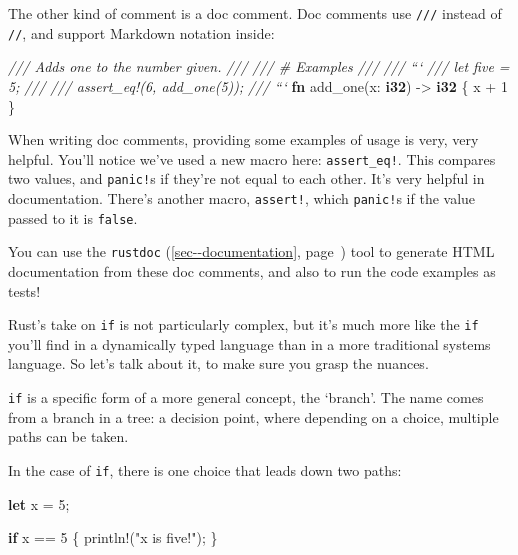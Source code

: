 \documentclass[a4paper,]{book}
\renewcommand*{\hyperref}[2][\ar]{%
  \def\ar{#2}%
  #2 (\autoref{#1}, page~\pageref{#1})}
\newenvironment{Shaded}{\begin{snugshade}}{\end{snugshade}}
\newcommand{\KeywordTok}[1]{\textcolor[rgb]{0.13,0.29,0.53}{\textbf{{#1}}}}
\newcommand{\DecValTok}[1]{\textcolor[rgb]{0.00,0.00,0.81}{{#1}}}
\newcommand{\StringTok}[1]{\textcolor[rgb]{0.31,0.60,0.02}{{#1}}}
\newcommand{\CommentTok}[1]{\textcolor[rgb]{0.56,0.35,0.01}{\textit{{#1}}}}
\newcommand{\OtherTok}[1]{\textcolor[rgb]{0.56,0.35,0.01}{{#1}}}
\newcommand{\NormalTok}[1]{{#1}}
\begin{document}
The other kind of comment is a doc comment. Doc comments use
\texttt{///} instead of \texttt{//}, and support Markdown notation
inside:

\begin{Shaded}
\begin{Highlighting}[]
\CommentTok{/// Adds one to the number given.}
\CommentTok{///}
\CommentTok{/// # Examples}
\CommentTok{///}
\CommentTok{/// ```}
\CommentTok{/// let five = 5;}
\CommentTok{///}
\CommentTok{/// assert_eq!(6, add_one(5));}
\CommentTok{/// ```}
\KeywordTok{fn} \NormalTok{add_one(x: }\KeywordTok{i32}\NormalTok{) -> }\KeywordTok{i32} \NormalTok{\{}
    \NormalTok{x + }\DecValTok{1}
\NormalTok{\}}
\end{Highlighting}
\end{Shaded}

When writing doc comments, providing some examples of usage is very,
very helpful. You'll notice we've used a new macro here:
\texttt{assert\_eq!}. This compares two values, and \texttt{panic!}s if
they're not equal to each other. It's very helpful in documentation.
There's another macro, \texttt{assert!}, which \texttt{panic!}s if the
value passed to it is \texttt{false}.

You can use the \hyperref[sec--documentation]{\texttt{rustdoc}} tool to
generate HTML documentation from these doc comments, and also to run the
code examples as tests!


Rust's take on \texttt{if} is not particularly complex, but it's much
more like the \texttt{if} you'll find in a dynamically typed language
than in a more traditional systems language. So let's talk about it, to
make sure you grasp the nuances.

\texttt{if} is a specific form of a more general concept, the `branch'.
The name comes from a branch in a tree: a decision point, where
depending on a choice, multiple paths can be taken.

In the case of \texttt{if}, there is one choice that leads down two
paths:

\begin{Shaded}
\begin{Highlighting}[]
\KeywordTok{let} \NormalTok{x = }\DecValTok{5}\NormalTok{;}

\KeywordTok{if} \NormalTok{x == }\DecValTok{5} \NormalTok{\{}
    \OtherTok{println!}\NormalTok{(}\StringTok{"x is five!"}\NormalTok{);}
\NormalTok{\}}
\end{Highlighting}
\end{Shaded}
\end{document}
